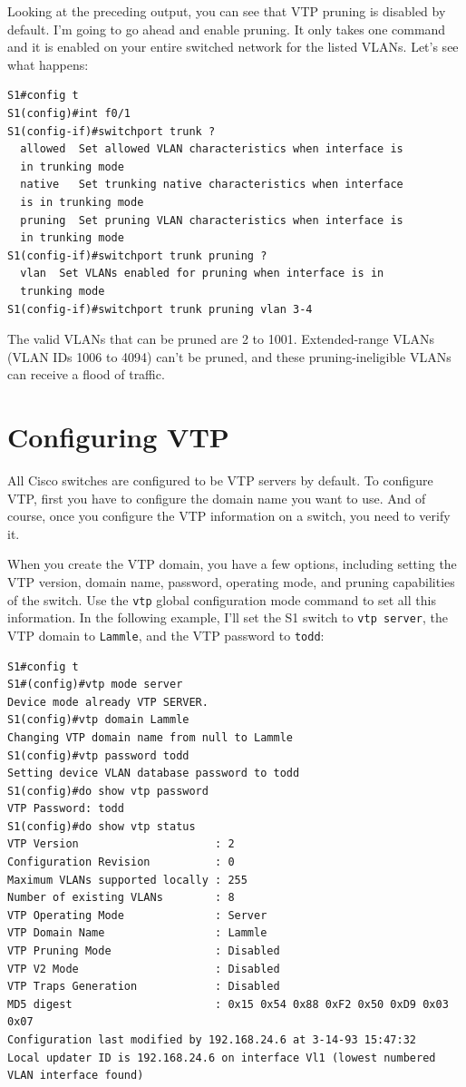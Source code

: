 \documentclass[b5paper,11pt]{memoir}
\begin{document}
Looking at the preceding output, you can see that VTP pruning is
disabled by default. I'm going to go ahead and enable pruning. It only
takes one command and it is enabled on your entire switched network for
the listed VLANs. Let's see what happens:

\begin{verbatim}
S1#config t
S1(config)#int f0/1
S1(config-if)#switchport trunk ?
  allowed  Set allowed VLAN characteristics when interface is
  in trunking mode
  native   Set trunking native characteristics when interface
  is in trunking mode
  pruning  Set pruning VLAN characteristics when interface is
  in trunking mode
S1(config-if)#switchport trunk pruning ?
  vlan  Set VLANs enabled for pruning when interface is in
  trunking mode
S1(config-if)#switchport trunk pruning vlan 3-4
\end{verbatim}

The valid VLANs that can be pruned are 2 to 1001. Extended-range VLANs
(VLAN IDs 1006 to 4094) can't be pruned, and these pruning-ineligible
VLANs can receive a flood of traffic.

\section{Configuring VTP}

All Cisco switches are configured to be VTP servers by default. To
configure VTP, first you have to configure the domain name you want to
use. And of course, once you configure the VTP information on a switch,
you need to verify it.

When you create the VTP domain, you have a few options, including
setting the VTP version, domain name, password, operating mode, and
pruning capabilities of the switch. Use the \texttt{vtp} global
configuration mode command to set all this information. In the following
example, I'll set the S1 switch to \texttt{vtp\ server}, the VTP domain
to \texttt{Lammle}, and the VTP password to \texttt{todd}:

\begin{verbatim}
S1#config t
S1#(config)#vtp mode server
Device mode already VTP SERVER.
S1(config)#vtp domain Lammle
Changing VTP domain name from null to Lammle
S1(config)#vtp password todd
Setting device VLAN database password to todd
S1(config)#do show vtp password
VTP Password: todd
S1(config)#do show vtp status
VTP Version                     : 2
Configuration Revision          : 0
Maximum VLANs supported locally : 255
Number of existing VLANs        : 8
VTP Operating Mode              : Server
VTP Domain Name                 : Lammle
VTP Pruning Mode                : Disabled
VTP V2 Mode                     : Disabled
VTP Traps Generation            : Disabled
MD5 digest                      : 0x15 0x54 0x88 0xF2 0x50 0xD9 0x03 0x07
Configuration last modified by 192.168.24.6 at 3-14-93 15:47:32
Local updater ID is 192.168.24.6 on interface Vl1 (lowest numbered VLAN interface found)
\end{verbatim}
\end{document}
